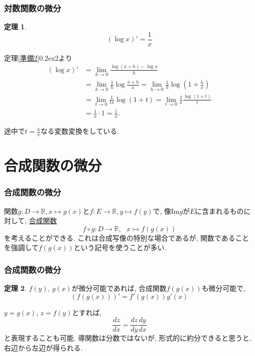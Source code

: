 \documentclass[dvipdfmx,cjk,10.2pt]{beamer}
\newcommand{\R}{\mathbb{R}}
\newcommand{\ctext}[1]{\raise0.2ex\hbox{\textcircled{\scriptsize{#1}}}}
\theoremstyle{definition}
\newtheorem{Thm}{定理}[section]
\begin{document}
\begin{frame}
\frametitle{対数関数の微分}


\begin{Thm} 
$$(\log x)'=\frac{1}{x}$$
\end{Thm}

定理\ref{準備2}\ctext{2}より \vspace{-2mm}
\begin{align*} 
(\log x)' &= \lim_{h\to0}\frac{\log(x+h)-\log x}{h} \\
&= \lim_{h\to0}\frac{1}{h} \log \frac{x+h}{x} = \lim_{h\to0}\frac{1}{h} \log (1+\frac{h}{x}) \\
&= \lim_{t\to0}\frac{1}{tx} \log (1+t) = \lim_{t\to0}\frac{1}{x} \frac{\log (1+t)}{t} \\
&=\frac{1}{x}\cdot 1=\frac{1}{x}. 
\end{align*}

途中で$t=\frac{h}{x}$なる変数変換をしている. 

\end{frame}




\section{合成関数の微分}

\begin{frame}
\frametitle{合成関数の微分}

関数$g:D \rightarrow \R, x\mapsto g(x)$と$f:E\rightarrow \R, y\mapsto f(y)$で, 像$\mathrm{Im}g$が$E$に含まれるものに対して, 
\underline{合成関数}
$$
f\circ g:D \longrightarrow \R, \ \ \ x \mapsto f(g(x))
$$
を考えることができる. 
これは合成写像の特別な場合であるが, 関数であることを強調して$f(g(x))$という記号を使うことが多い. 


\end{frame}




\begin{frame}
\frametitle{合成関数の微分}


\begin{Thm} \label{合成関数}
$f(y)$, $g(x)$が微分可能であれば, 合成関数$f(g(x))$も微分可能で, 
$$
(f(g(x)))'=f'(g(x))g'(x)
$$
\end{Thm}
$y=g(x)$, $z=f(y)$とすれば, 
$$
\frac{dz}{dx}=\frac{dz}{dy} \frac{dy}{dx}
$$
と表現することも可能. 
導関数は分数ではないが, 形式的に約分できると思うと, 右辺から左辺が得られる. 

\end{frame}
\end{document}
